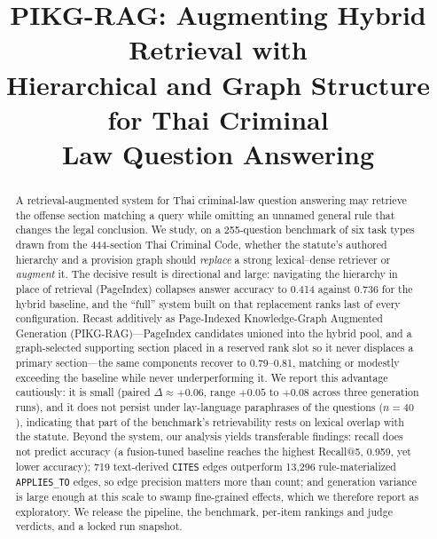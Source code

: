 \documentclass[conference]{IEEEtran}
\begin{document}
\title{PIKG-RAG: Augmenting Hybrid Retrieval with\\
Hierarchical and Graph Structure for Thai Criminal\\
Law Question Answering}

\author{}

\maketitle

\begin{abstract}
A retrieval-augmented system for Thai criminal-law question answering may retrieve the offense
section matching a query while omitting an unnamed general rule that changes the legal conclusion.
We study, on a 255-question benchmark of six task types drawn from the 444-section Thai Criminal
Code, whether the statute's authored hierarchy and a provision graph should \emph{replace} a strong
lexical--dense retriever or \emph{augment} it. The decisive result is directional and large:
navigating the hierarchy in place of retrieval (PageIndex) collapses answer accuracy to 0.414
against 0.736 for the hybrid baseline, and the ``full'' system built on that replacement ranks last
of every configuration. Recast additively as Page-Indexed Knowledge-Graph Augmented Generation (PIKG-RAG)---PageIndex
candidates unioned into the hybrid pool, and a graph-selected supporting section placed in a reserved
rank slot so it never displaces a primary section---the same components recover to 0.79--0.81,
matching or modestly exceeding the baseline while never underperforming it. We report this advantage cautiously: it is small (paired
$\Delta\approx+0.06$, range $+0.05$ to $+0.08$ across three generation runs), and it does not persist
under lay-language paraphrases of the questions ($n=40$), indicating that part of the benchmark's
retrievability rests on lexical overlap with the statute. Beyond the system, our analysis yields
transferable findings: recall does not predict accuracy (a fusion-tuned baseline reaches the highest
Recall@5, 0.959, yet lower accuracy); 719 text-derived \texttt{CITES} edges outperform 13{,}296
rule-materialized \texttt{APPLIES\_TO} edges, so edge precision matters more than count; and
generation variance is large enough at this scale to swamp fine-grained effects, which we therefore
report as exploratory. We release the pipeline, the benchmark, per-item rankings and judge verdicts,
and a locked run snapshot.
\end{abstract}
\end{document}
